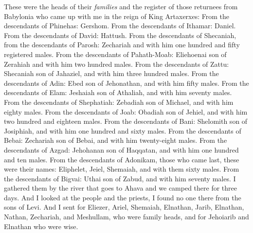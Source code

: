 \begin{biblechapter} %
 These were the heads of their \textit{families} and the register of those returnees from Babylonia who came up with me in the reign of King Artaxerxes:
\verse From the descendants of Phinehas: Gershom. From the descendants of Ithamar: Daniel. From the descendants of David: Hattush.
\verse From the descendants of Shecaniah, from the descendants of Parosh: Zechariah and with him one hundred and fifty registered males.
\verse From the descendants of Pahath-Moab: Eliehoenai son of Zerahiah and with him two hundred males.
\verse From the descendants of Zattu: Shecaniah son of Jahaziel, and with him three hundred males.
\verse From the descendants of Adin: Ebed son of Jehonathan, and with him fifty males.
\verse From the descendants of Elam: Jeshaiah son of Athaliah, and with him seventy males.
\verse From the descendants of Shephatiah: Zebadiah son of Michael, and with him eighty males.
\verse From the descendants of Joab: Obadiah son of Jehiel, and with him two hundred and eighteen males.
\verse From the descendants of Bani: Shelomith son of Josiphiah, and with him one hundred and sixty males.
\verse From the descendants of Bebai: Zechariah son of Bebai, and with him twenty-eight males.
\verse From the descendants of Azgad: Jehohanan son of Haqqatan, and with him one hundred and ten males.
\verse From the descendants of Adonikam, those who came last, these were their names: Eliphelet, Jeiel, Shemaiah, and with them sixty males.
\verse From the descendants of Bigvai: Uthai son of Zabud, and with him seventy males.
 I gathered them by the river that goes to Ahava and we camped there for three days. And I looked at the people and the priests, I found no one there from the sons of Levi.
\verse And I sent for Eliezer, Ariel, Shemaiah, Elnathan, Jarib, Elnathan, Nathan, Zechariah, and Meshullam, who were family heads, and for Jehoiarib and Elnathan who were wise.

\end{biblechapter}
